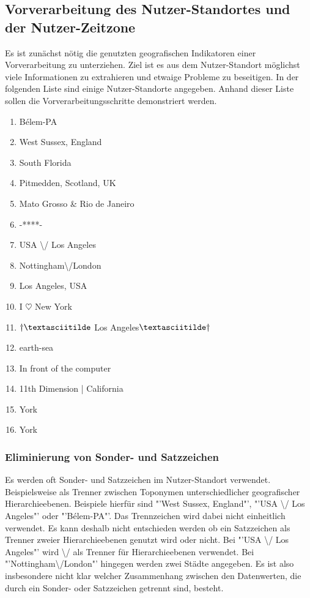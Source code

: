 		\subsection{Vorverarbeitung des Nutzer-Standortes und der Nutzer-Zeitzone} \label{subsec:VorverarbeitungStandortZeitzone} 
			
			Es ist zunächst nötig die genutzten geografischen Indikatoren einer Vorverarbeitung zu unterziehen. 
			Ziel ist es aus dem Nutzer-Standort möglichst viele Informationen zu extrahieren und etwaige Probleme zu beseitigen.
			In der folgenden Liste sind einige Nutzer-Standorte angegeben. 
			Anhand dieser Liste sollen die Vorverarbeitungsschritte demonstriert werden.

			\begin{multicols}{2}
			\begin{enumerate}
				\item Bélem-PA
				\item West Sussex, England
				\item South Florida
				\item Pitmedden,  Scotland, UK
				\item Mato Grosso \& Rio de Janeiro
				\item -****-
				\item USA \textbackslash/ Los Angeles
				\item Nottingham\textbackslash/London
				\item Los Angeles, USA
				\item I $\heartsuit$ New York 
				\item $\dagger\textasciitilde$ Los Angeles$\textasciitilde\dagger$
				\item earth-sea
				\item In front of the computer
				\item 11th Dimension | California
				\item York
				\item York
			\end{enumerate}
			\end{multicols}
				
			\subsubsection{Eliminierung von Sonder- und Satzzeichen} 

				Es werden oft Sonder- und Satzzeichen im Nutzer-Standort verwendet. 
				Beispielsweise als Trenner zwischen Toponymen unterschiedlicher geografischer Hierarchieebenen.
				Beispiele hierfür sind "'West Sussex, England"', "'USA \textbackslash/ Los Angeles"' oder "'Bélem-PA"'.
				Das Trennzeichen wird dabei nicht einheitlich verwendet.  
				Es kann deshalb nicht entschieden werden ob ein Satzzeichen als Trenner zweier Hierarchieebenen genutzt wird oder nicht.
				Bei "'USA \textbackslash/ Los Angeles"' wird \textbackslash/ als Trenner für Hierarchieebenen verwendet.
				Bei "'Nottingham\textbackslash/London"' hingegen werden zwei Städte angegeben.
				Es ist also insbesondere nicht klar welcher Zusammenhang zwischen den Datenwerten, die durch ein Sonder- oder Satzzeichen getrennt sind, besteht. 

